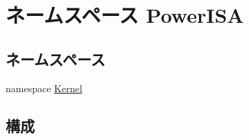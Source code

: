 \hypertarget{namespacePowerISA}{
\section{ネームスペース PowerISA}
\label{namespacePowerISA}
}
\subsection*{ネームスペース}
\begin{DoxyCompactItemize}
\item 
namespace \hyperlink{namespacePowerISA_1_1Kernel}{Kernel}
\end{DoxyCompactItemize}
\subsection*{構成}
